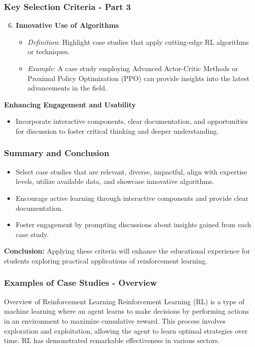 \documentclass[aspectratio=169]{beamer}
\begin{document}
\begin{frame}[fragile]
    \frametitle{Key Selection Criteria - Part 3}
    \begin{enumerate}
        \setcounter{enumi}{5} %
        \item \textbf{Innovative Use of Algorithms}
            \begin{itemize}
                \item \textit{Definition}: Highlight case studies that apply cutting-edge RL algorithms or techniques.
                \item \textit{Example}: A case study employing Advanced Actor-Critic Methods or Proximal Policy Optimization (PPO) can provide insights into the latest advancements in the field.
            \end{itemize}
    \end{enumerate}
    
    \textbf{Enhancing Engagement and Usability}
    \begin{itemize}
        \item Incorporate interactive components, clear documentation, and opportunities for discussion to foster critical thinking and deeper understanding.
    \end{itemize}
\end{frame}

\begin{frame}[fragile]
    \frametitle{Summary and Conclusion}
    \begin{itemize}
        \item Select case studies that are relevant, diverse, impactful, align with expertise levels, utilize available data, and showcase innovative algorithms.
        \item Encourage active learning through interactive components and provide clear documentation.
        \item Foster engagement by prompting discussions about insights gained from each case study.
    \end{itemize}
    
    \textbf{Conclusion:} Applying these criteria will enhance the educational experience for students exploring practical applications of reinforcement learning.
\end{frame}

\begin{frame}[fragile]
    \frametitle{Examples of Case Studies - Overview}
    \begin{block}{Overview of Reinforcement Learning}
        Reinforcement Learning (RL) is a type of machine learning where an agent learns to make decisions by performing actions in an environment to maximize cumulative reward. This process involves exploration and exploitation, allowing the agent to learn optimal strategies over time. RL has demonstrated remarkable effectiveness in various sectors.
    \end{block}
\end{frame}
\end{document}
